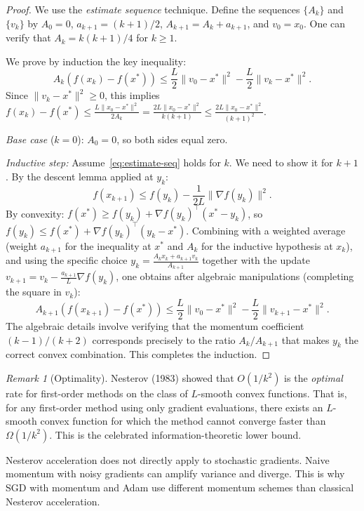 \documentclass[11pt,a4paper]{article}
\theoremstyle{definition}
\theoremstyle{plain}
\theoremstyle{remark}
\newtheorem{remark}{Remark}[section]
\begin{document}
\begin{proof}
We use the \emph{estimate sequence} technique. Define the sequences
$\{A_k\}$ and $\{v_k\}$ by $A_0 = 0$, $a_{k+1} = (k+1)/2$,
$A_{k+1} = A_k + a_{k+1}$, and $v_0 = x_0$. One can verify that
$A_k = k(k+1)/4$ for $k \ge 1$.

We prove by induction the key inequality:
\begin{equation}\label{eq:estimate-seq}
  A_k (f(x_k) - f(x^*)) \le \frac{L}{2}\|v_0 - x^*\|^2
    - \frac{L}{2}\|v_k - x^*\|^2.
\end{equation}
Since $\|v_k - x^*\|^2 \ge 0$, this implies
$f(x_k) - f(x^*) \le \frac{L\|x_0 - x^*\|^2}{2A_k}
= \frac{2L\|x_0 - x^*\|^2}{k(k+1)} \le \frac{2L\|x_0 - x^*\|^2}{(k+1)^2}$.

\emph{Base case} ($k = 0$): $A_0 = 0$, so both sides equal zero.

\emph{Inductive step:} Assume~\eqref{eq:estimate-seq} holds for $k$. We need to
show it for $k+1$. By the descent lemma applied at $y_k$:
\[
  f(x_{k+1}) \le f(y_k) - \frac{1}{2L}\|\nabla f(y_k)\|^2.
\]
By convexity: $f(x^*) \ge f(y_k) + \nabla f(y_k)^\top(x^* - y_k)$, so
$f(y_k) \le f(x^*) + \nabla f(y_k)^\top(y_k - x^*)$. Combining with
a weighted average (weight $a_{k+1}$ for the inequality at $x^*$ and $A_k$
for the inductive hypothesis at $x_k$), and using the specific choice
$y_k = \frac{A_k x_k + a_{k+1} v_k}{A_{k+1}}$ together with the update
$v_{k+1} = v_k - \frac{a_{k+1}}{L}\nabla f(y_k)$, one obtains
after algebraic manipulations (completing the square in $v_k$):
\[
  A_{k+1}(f(x_{k+1}) - f(x^*))
  \le \frac{L}{2}\|v_0 - x^*\|^2 - \frac{L}{2}\|v_{k+1} - x^*\|^2.
\]
The algebraic details involve verifying that the momentum coefficient
$(k-1)/(k+2)$ corresponds precisely to the ratio $A_k/A_{k+1}$ that makes
$y_k$ the correct convex combination. This completes the induction.
\end{proof}

\begin{remark}[Optimality]\label{rem:optimal}
Nesterov (1983) showed that $O(1/k^2)$ is the \emph{optimal} rate for
first-order methods on the class of $L$-smooth convex functions. That is,
for any first-order method using only gradient evaluations, there exists an
$L$-smooth convex function for which the method cannot converge faster than
$\Omega(1/k^2)$. This is the celebrated information-theoretic lower bound.
\end{remark}

\begin{warning}
Nesterov acceleration does not directly apply to stochastic gradients. Naive
momentum with noisy gradients can amplify variance and diverge. This is why
SGD with momentum and Adam use different momentum schemes than classical
Nesterov acceleration.
\end{warning}
\end{document}
